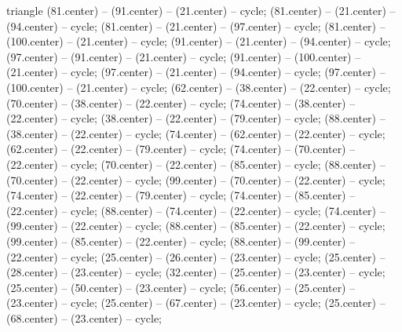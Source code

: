 \begin{pgfonlayer}{triangle}
 (81.center) -- (91.center) -- (21.center) -- cycle; 
 (81.center) -- (21.center) -- (94.center) -- cycle; 
 (81.center) -- (21.center) -- (97.center) -- cycle; 
 (81.center) -- (100.center) -- (21.center) -- cycle; 
 (91.center) -- (21.center) -- (94.center) -- cycle; 
 (97.center) -- (91.center) -- (21.center) -- cycle; 
 (91.center) -- (100.center) -- (21.center) -- cycle; 
 (97.center) -- (21.center) -- (94.center) -- cycle; 
 (97.center) -- (100.center) -- (21.center) -- cycle; 
 (62.center) -- (38.center) -- (22.center) -- cycle; 
 (70.center) -- (38.center) -- (22.center) -- cycle; 
 (74.center) -- (38.center) -- (22.center) -- cycle; 
 (38.center) -- (22.center) -- (79.center) -- cycle; 
 (88.center) -- (38.center) -- (22.center) -- cycle; 
 (74.center) -- (62.center) -- (22.center) -- cycle; 
 (62.center) -- (22.center) -- (79.center) -- cycle; 
 (74.center) -- (70.center) -- (22.center) -- cycle; 
 (70.center) -- (22.center) -- (85.center) -- cycle; 
 (88.center) -- (70.center) -- (22.center) -- cycle; 
 (99.center) -- (70.center) -- (22.center) -- cycle; 
 (74.center) -- (22.center) -- (79.center) -- cycle; 
 (74.center) -- (85.center) -- (22.center) -- cycle; 
 (88.center) -- (74.center) -- (22.center) -- cycle; 
 (74.center) -- (99.center) -- (22.center) -- cycle; 
 (88.center) -- (85.center) -- (22.center) -- cycle; 
 (99.center) -- (85.center) -- (22.center) -- cycle; 
 (88.center) -- (99.center) -- (22.center) -- cycle; 
 (25.center) -- (26.center) -- (23.center) -- cycle; 
 (25.center) -- (28.center) -- (23.center) -- cycle; 
 (32.center) -- (25.center) -- (23.center) -- cycle; 
 (25.center) -- (50.center) -- (23.center) -- cycle; 
 (56.center) -- (25.center) -- (23.center) -- cycle; 
 (25.center) -- (67.center) -- (23.center) -- cycle; 
 (25.center) -- (68.center) -- (23.center) -- cycle; 

\end{pgfonlayer}
